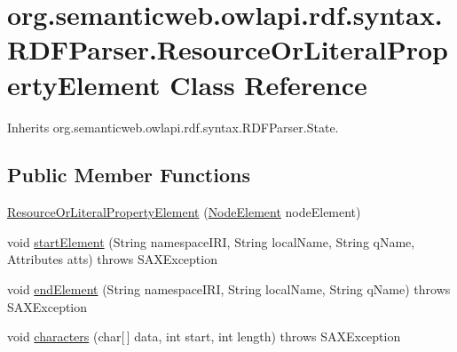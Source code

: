 \hypertarget{classorg_1_1semanticweb_1_1owlapi_1_1rdf_1_1syntax_1_1_r_d_f_parser_1_1_resource_or_literal_property_element}{\section{org.\-semanticweb.\-owlapi.\-rdf.\-syntax.\-R\-D\-F\-Parser.\-Resource\-Or\-Literal\-Property\-Element Class Reference}
\label{classorg_1_1semanticweb_1_1owlapi_1_1rdf_1_1syntax_1_1_r_d_f_parser_1_1_resource_or_literal_property_element}
}


Inherits org.\-semanticweb.\-owlapi.\-rdf.\-syntax.\-R\-D\-F\-Parser.\-State.

\subsection*{Public Member Functions}
\begin{DoxyCompactItemize}
\item 
\hyperlink{classorg_1_1semanticweb_1_1owlapi_1_1rdf_1_1syntax_1_1_r_d_f_parser_1_1_resource_or_literal_property_element_aa48fe378729b5fec5c8f27cbd0b19289}{Resource\-Or\-Literal\-Property\-Element} (\hyperlink{classorg_1_1semanticweb_1_1owlapi_1_1rdf_1_1syntax_1_1_r_d_f_parser_1_1_node_element}{Node\-Element} node\-Element)
\item 
void \hyperlink{classorg_1_1semanticweb_1_1owlapi_1_1rdf_1_1syntax_1_1_r_d_f_parser_1_1_resource_or_literal_property_element_aa6063387b1b17debd4966db9db51654b}{start\-Element} (String namespace\-I\-R\-I, String local\-Name, String q\-Name, Attributes atts)  throws S\-A\-X\-Exception 
\item 
void \hyperlink{classorg_1_1semanticweb_1_1owlapi_1_1rdf_1_1syntax_1_1_r_d_f_parser_1_1_resource_or_literal_property_element_af4ca045313ad4568c2962ab17bd7aeaf}{end\-Element} (String namespace\-I\-R\-I, String local\-Name, String q\-Name)  throws S\-A\-X\-Exception 
\item 
void \hyperlink{classorg_1_1semanticweb_1_1owlapi_1_1rdf_1_1syntax_1_1_r_d_f_parser_1_1_resource_or_literal_property_element_a49a17eb7b4cbafa1af861ebf5f6452a4}{characters} (char\mbox{[}$\,$\mbox{]} data, int start, int length)  throws S\-A\-X\-Exception 
\end{DoxyCompactItemize}
